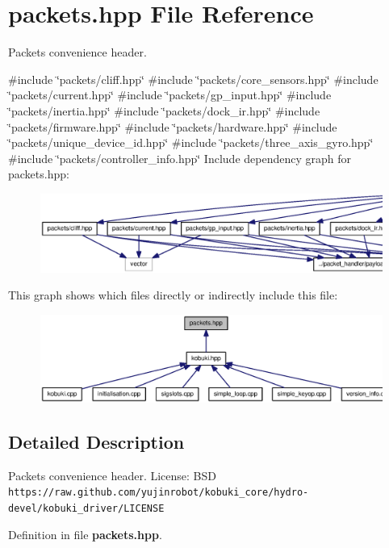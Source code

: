 \section{packets.\-hpp \-File \-Reference}
\label{packets_8hpp}


\-Packets convenience header.  


{\ttfamily \#include \char`\"{}packets/cliff.\-hpp\char`\"{}}\*
{\ttfamily \#include \char`\"{}packets/core\-\_\-sensors.\-hpp\char`\"{}}\*
{\ttfamily \#include \char`\"{}packets/current.\-hpp\char`\"{}}\*
{\ttfamily \#include \char`\"{}packets/gp\-\_\-input.\-hpp\char`\"{}}\*
{\ttfamily \#include \char`\"{}packets/inertia.\-hpp\char`\"{}}\*
{\ttfamily \#include \char`\"{}packets/dock\-\_\-ir.\-hpp\char`\"{}}\*
{\ttfamily \#include \char`\"{}packets/firmware.\-hpp\char`\"{}}\*
{\ttfamily \#include \char`\"{}packets/hardware.\-hpp\char`\"{}}\*
{\ttfamily \#include \char`\"{}packets/unique\-\_\-device\-\_\-id.\-hpp\char`\"{}}\*
{\ttfamily \#include \char`\"{}packets/three\-\_\-axis\-\_\-gyro.\-hpp\char`\"{}}\*
{\ttfamily \#include \char`\"{}packets/controller\-\_\-info.\-hpp\char`\"{}}\*
\-Include dependency graph for packets.\-hpp\-:
\nopagebreak
\begin{figure}[H]
\begin{center}
\leavevmode
\includegraphics[width=350pt]{packets_8hpp__incl}
\end{center}
\end{figure}
\-This graph shows which files directly or indirectly include this file\-:
\nopagebreak
\begin{figure}[H]
\begin{center}
\leavevmode
\includegraphics[width=350pt]{packets_8hpp__dep__incl}
\end{center}
\end{figure}


\subsection{\-Detailed \-Description}
\-Packets convenience header. \-License\-: \-B\-S\-D {\tt https\-://raw.\-github.\-com/yujinrobot/kobuki\-\_\-core/hydro-\/devel/kobuki\-\_\-driver/\-L\-I\-C\-E\-N\-S\-E} 

\-Definition in file {\bf packets.\-hpp}.

